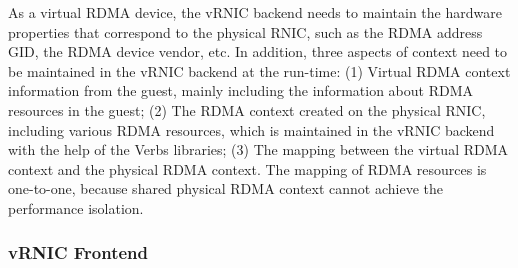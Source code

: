 As a virtual RDMA device, the vRNIC backend needs to maintain the hardware properties that correspond to the physical RNIC, such as the RDMA address GID, the RDMA device vendor, etc. In addition, three aspects of context need to be maintained in the vRNIC backend at the run-time:
(1) Virtual RDMA context information from the guest, mainly including the information about RDMA resources in the guest;
(2) The RDMA context created on the physical RNIC,  including various RDMA resources, which is maintained in the vRNIC backend with the help of the Verbs libraries;
(3) The mapping between the virtual RDMA context and the physical RDMA context. The mapping of RDMA resources is one-to-one, because shared physical RDMA context cannot achieve the performance isolation.


\subsubsection{vRNIC Frontend}


